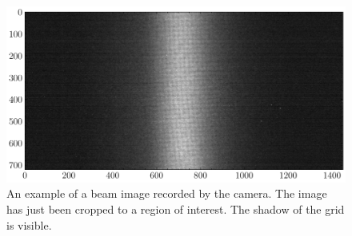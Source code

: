 \begin{figure}[!ht]
	\begin{center}
		\includegraphics[width=\textwidth]{04_IPHI_Test/figures/fig000_image_beam}
	\end{center}
	\caption[An example of a beam image recorded by the camera]{An example of a beam image recorded by the camera. The image has just been cropped to a region of interest. The shadow of the grid is visible.}
	\label{chap4:image_beam}
\end{figure}
